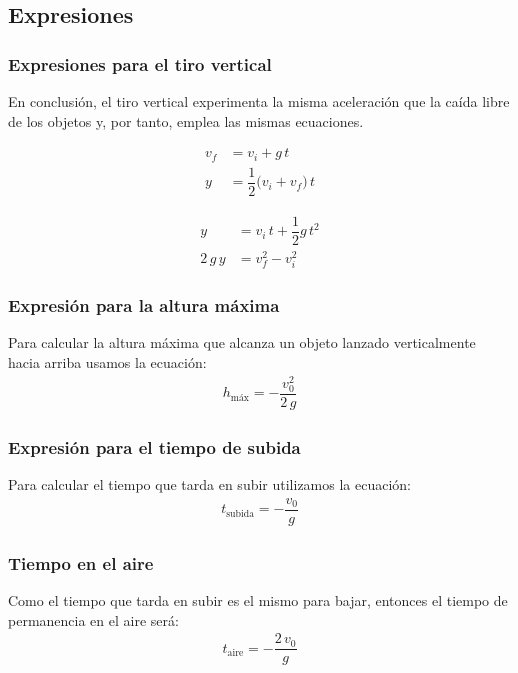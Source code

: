 \documentclass[14pt]{beamer}
\begin{document}
\subsection{Expresiones}

\begin{frame}
\frametitle{Expresiones para el tiro vertical}
\vspace*{-1cm}
En conclusión, el tiro vertical experimenta la misma aceleración que la caída libre de los objetos \pause y, por tanto, emplea las mismas ecuaciones.
\\
\pause
\begin{minipage}{0.4\linewidth}
\begin{align*}
v_{f} &= v_{i} + g \, t \\[0.5em]
y &= \dfrac{1}{2} \big( v_{i} + v_{f} \big) \, t
\end{align*}
\end{minipage}
\hspace{1cm}
\begin{minipage}{0.4\linewidth}
\begin{align*}
y &= v_{i} \, t + \dfrac{1}{2} g \, t^{2} \\[0.5em]
2 \, g \, y &= v_{f}^{2} - v_{i}^{2} 
\end{align*}
\end{minipage}   
\end{frame}
\begin{frame}
\frametitle{Expresión para la altura máxima}
Para calcular la altura máxima que alcanza un objeto lanzado verticalmente hacia arriba usamos la ecuación:
\pause
\begin{align*}
h_{\text{máx}} = - \dfrac{v_{0}^{2}}{2 \, g}
\end{align*}
\end{frame}
\begin{frame}
\frametitle{Expresión para el tiempo de subida}
Para calcular el tiempo que tarda en subir utilizamos la ecuación:
\pause
\begin{align*}
t_{\text{subida}} = - \dfrac{v_{0}}{g}
\end{align*}
\end{frame}
\begin{frame}
\frametitle{Tiempo en el aire}
Como el tiempo que tarda en subir es el mismo para bajar, entonces el tiempo de permanencia en el aire será:
\begin{align*}
t_{\text{aire}} = - \dfrac{2 \, v_{0}}{g}
\end{align*}    
\end{frame}
\end{document}

